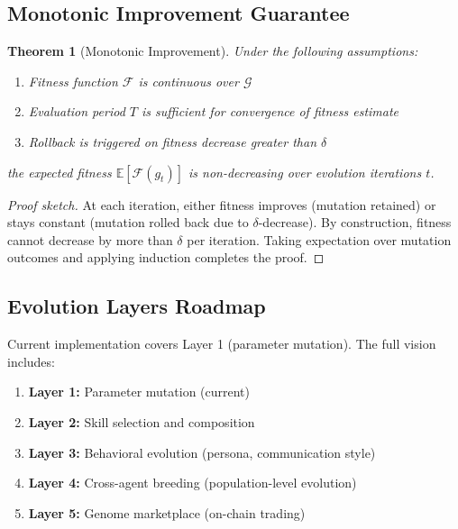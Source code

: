 \documentclass{article}
\newtheorem{theorem}{Theorem}
\newcommand{\fitnessfn}{\mathcal{F}}
\newcommand{\genomespace}{\mathcal{G}}
\begin{document}
\subsection{Monotonic Improvement Guarantee}

\begin{theorem}[Monotonic Improvement]
Under the following assumptions:
\begin{enumerate}
    \item Fitness function $\fitnessfn$ is continuous over $\genomespace$
    \item Evaluation period $T$ is sufficient for convergence of fitness estimate
    \item Rollback is triggered on fitness decrease greater than $\delta$
\end{enumerate}
the expected fitness $\mathbb{E}[\fitnessfn(g_t)]$ is non-decreasing over evolution iterations $t$.
\end{theorem}

\begin{proof}[Proof sketch]
At each iteration, either fitness improves (mutation retained) or stays constant (mutation rolled back due to $\delta$-decrease). By construction, fitness cannot decrease by more than $\delta$ per iteration. Taking expectation over mutation outcomes and applying induction completes the proof.
\end{proof}

\subsection{Evolution Layers Roadmap}

Current implementation covers Layer 1 (parameter mutation). The full vision includes:

\begin{enumerate}[leftmargin=*]
    \item \textbf{Layer 1:} Parameter mutation (current)
    \item \textbf{Layer 2:} Skill selection and composition
    \item \textbf{Layer 3:} Behavioral evolution (persona, communication style)
    \item \textbf{Layer 4:} Cross-agent breeding (population-level evolution)
    \item \textbf{Layer 5:} Genome marketplace (on-chain trading)
\end{enumerate}


\end{document}
